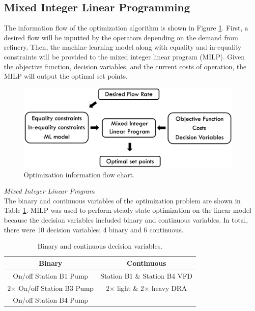 \subsection{Mixed Integer Linear Programming}
The information flow of the optimization algorithm is shown in Figure \ref{fig:08Optimization_flow}.  First, a desired flow will be inputted by the operators depending on the demand from refinery.  Then, the machine learning model along with equality and in-equality constraints will be provided to the mixed integer linear program (MILP).  Given the objective function, decision variables, and the current costs of operation, the MILP will output the optimal set points.
\begin{figure}[h]
    \centering
    \includegraphics[width=\textwidth]{images/suncor/08Optimization_flow.png}
    \caption{Optimization information flow chart.}
    \label{fig:08Optimization_flow}
\end{figure}

\noindent
\textit{Mixed Integer Linear Program} \\
The binary and continuous variables of the optimization problem are shown in Table \ref{tab:08binary_cont}. MILP was used to perform steady state optimization on the linear model because the decision variables included binary and continuous variables.  In total, there were 10 decision variables; 4 binary and 6 continuous. 

\begin{table}[h]
    \centering
    {
    \begin{tabular}{ c | c }
        Binary                       &  Continuous           \\
        \hline
        On/off Station B1 Pump               &  Station B1 \& Station B4 VFD            \\
        2$\times$ On/off Station B3 Pump         &  2$\times$ light \& 2$\times$ heavy DRA  \\
        On/off Station B4 Pump
    \end{tabular}}
    \caption{Binary and continuous decision variables.}
    \label{tab:08binary_cont}
\end{table}

